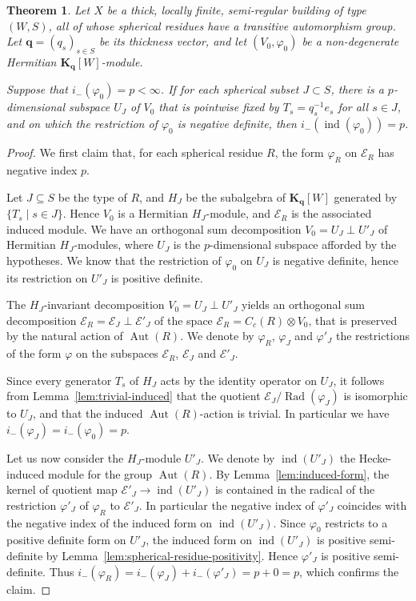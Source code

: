 \documentclass[12pt,a4paper]{amsproc}
\newtheorem{theorem}{Theorem}[section]
\theoremstyle{definition}
\DeclareMathOperator{\Aut}{Aut}
\DeclareMathOperator{\Ind}{ind}
\DeclareMathOperator{\Rad}{Rad}
\newcommand{\KK}{\mathbf K}
\begin{document}
\begin{theorem}\label{thm:main}
Let $X$ be a thick, locally finite, semi-regular building of type $(W, S)$, all of whose spherical residues have a  transitive automorphism group.  Let $\mathbf q = (q_s)_{s\in S}$ be its thickness vector, and let $(V_0, \varphi_0)$ be a non-degenerate Hermitian $\KK_{\mathbf q}[W]$-module. 

Suppose that $i_-(\varphi_0) = p<\infty$. If for each spherical subset $J  \subset S$, there is a   $p$-dimensional subspace $U_J$ of $V_0$ that is pointwise fixed by $T_s =  q_s^{-1} e_s$  for all $s \in J$, and on which the restriction of $\varphi_0$ is negative definite, then   $i_-(\Ind(\varphi_0)) = p$. 
\end{theorem}
\begin{proof} 
We  first claim that, for each spherical residue $R$, the form $\varphi_R$ on $\mathscr E_R$ has negative index $p$. 

Let $J \subseteq S$ be the type of $R$, and $H_J$ be the subalgebra of $\KK_{\mathbf q}[W]$ generated by $\{T_s \mid s \in J\}$. Hence $V_0$ is a Hermitian $H_J$-module, and $\mathscr E_R$ is the associated induced module. We have  an orthogonal sum decomposition $V_0 = U_J \perp  U'_J$ of Hermitian $H_J$-modules, where $U_J$ is the $p$-dimensional subspace afforded by the hypotheses. We know   that the restriction of $\varphi_0$ on $U_J$ is negative definite, hence its restriction on $U'_J$ is positive definite.  

The $H_J$-invariant decomposition  $V_0= U_J \perp  U'_J$ yields  an orthogonal sum decomposition $\mathscr E_R = \mathscr E_J \perp \mathscr E'_J$ of the space    $\mathscr E_R = C_c(R) \otimes V_0$, that is preserved by the natural action of $\Aut(R)$.  We denote by $\varphi_R$, $\varphi_J$ and $\varphi'_J$ the restrictions of the form $\varphi$ on the subspaces  $\mathscr E_R$, $\mathscr E_J $ and $ \mathscr E'_J$.  

 Since every generator $T_s$ of $H_J$ acts by the identity operator on $U_J$, it follows from Lemma~\ref{lem:trivial-induced} that the quotient     $\mathscr E_J/\Rad(\varphi_J)$ is   isomorphic to $U_J$, and that the induced   $\Aut(R)$-action is trivial.  In particular we have $i_-(\varphi_J) = i_-(\varphi_0) = p$.

Let us now consider the $H_J$-module $U'_J$. We denote by $\Ind(U'_J)$ the Hecke-induced module for the group $\Aut(R)$. By Lemma~\ref{lem:induced-form}, the kernel of quotient map $ \mathscr E'_J \to \Ind(U'_J)$ is contained in the radical of the restriction $\varphi'_J$ of $\varphi_R$ to $\mathscr E'_J$. In particular the negative index of  $ \varphi'_J$ coincides with the negative index of the induced form on $\Ind(U'_J)$.  Since $\varphi_0$ restricts to a positive definite form on $U'_J$, the induced form on $\Ind(U'_J)$ is positive semi-definite by Lemma~\ref{lem:spherical-residue-positivity}. Hence $\varphi'_J$ is positive semi-definite. Thus $i_-(\varphi_R) = i_-(\varphi_J) + i_-(\varphi'_J) = p +0= p$, which confirms the claim.


\end{proof}
\end{document}
